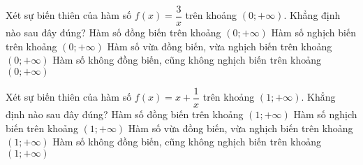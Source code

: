\begin{ex}%
	Xét sự biến thiên của hàm số $f(x)=\dfrac{3}{x}$ trên khoảng $(0;+\infty)$. Khẳng định nào sau đây đúng?
	\choice
	{Hàm số đồng biến trên khoảng $\left(0;+\infty \right)$}
	{\True Hàm số nghịch biến trên khoảng $\left(0;+\infty \right)$}
	{Hàm số vừa đồng biến, vừa nghịch biến trên khoảng $\left(0;+\infty \right)$}
	{Hàm số không đồng biến, cũng không nghịch biến trên khoảng $\left(0;+\infty \right)$}
\end{ex}
\begin{ex}%
	Xét sự biến thiên của hàm số $f(x)=x+\dfrac{1}{x}$ trên khoảng $\left(1;+\infty \right)$. Khẳng định nào sau đây đúng?
	\choice
	{\True Hàm số đồng biến trên khoảng $\left(1;+\infty \right)$}
	{Hàm số nghịch biến trên khoảng $\left(1;+\infty \right)$}
	{Hàm số vừa đồng biến, vừa nghịch biến trên khoảng $\left(1;+\infty \right)$}
	{Hàm số không đồng biến, cũng không nghịch biến trên khoảng $\left(1;+\infty \right)$}
\end{ex}
